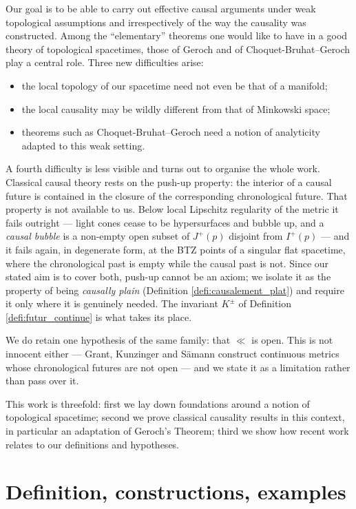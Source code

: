 \documentclass[a4paper,twoside]{article}
\begin{document}
Our goal is to be able to carry out effective causal arguments under weak topological
assumptions and irrespectively of the way the causality was constructed. Among the
``elementary'' theorems one would like to have in a good theory of topological
spacetimes, those of Geroch and of Choquet-Bruhat--Geroch play a central role. Three
new difficulties arise:
\begin{itemize}
\item the local topology of our spacetime need not even be that of a manifold;
\item the local causality may be wildly different from that of Minkowski space;
\item theorems such as Choquet-Bruhat--Geroch need a notion of analyticity adapted to
this weak setting.
\end{itemize}

A fourth difficulty is less visible and turns out to organise the whole work. Classical causal
theory rests on the push-up property: the interior of a causal future is contained in the closure of
the corresponding chronological future. That property is not available to us. Below local Lipschitz
regularity of the metric it fails outright --- light cones cease to be hypersurfaces and bubble up,
and a \emph{causal bubble} is a non-empty open subset of $J^+(p)$ disjoint from $I^+(p)$
\cite{MR2949547,MR3500220,samann2024nonregular} --- and it fails again, in degenerate form, at the
BTZ points of a singular flat spacetime, where the chronological past is empty while the causal past
is not. Since our stated aim is to cover both, push-up cannot be an axiom; we isolate it as the
property of being \emph{causally plain} (Definition \ref{defi:causalement_plat}) and require it only
where it is genuinely needed. The invariant $K^\pm$ of Definition \ref{defi:futur_continue} is what
takes its place.

We do retain one hypothesis of the same family: that $\ll$ is open. This is not innocent either ---
Grant, Kunzinger and S\"amann \cite{MR4047145} construct continuous metrics whose chronological
futures are not open --- and we state it as a limitation rather than pass over it.

This work is threefold: first we lay down foundations around a notion of topological
spacetime; second we prove classical causality results in this context, in particular
an adaptation of Geroch's Theorem; third we show how recent work relates to our
definitions and hypotheses.

\section{Definition, constructions, examples}
\end{document}
